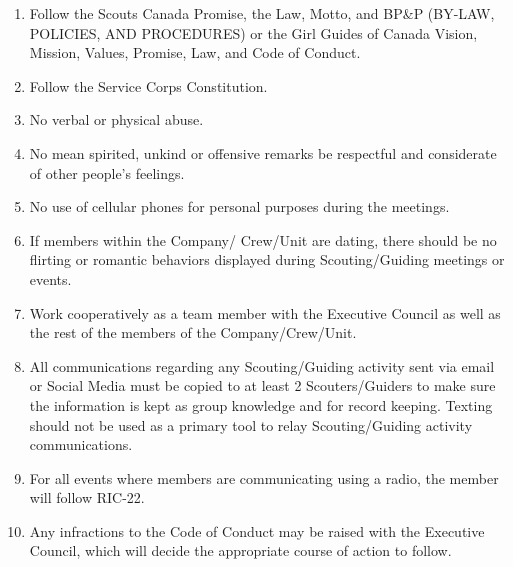 \documentclass{Service_Corps_Document}
\begin{document}
    \def \Title {Code of Conduct}
    \def \Company {Service Corps}
    \def \versionNumber {3.0}
    \stdFooter
    \begin{titlepage}
        \stdTitlePage
    \end{titlepage}
    \begin{enumerate}
        \item Follow the Scouts Canada Promise, the Law, Motto, and BP\&P (BY-LAW, POLICIES, AND PROCEDURES) or the Girl Guides of Canada Vision, Mission, Values, Promise, Law, and Code of Conduct.
        \item Follow the Service Corps Constitution.
        \item No verbal or physical abuse.
        \item No mean spirited, unkind or offensive remarks \textendash be respectful and considerate of other people's feelings.
        \item No use of cellular phones for personal purposes during the meetings.
        \item If members within the Company/ Crew/Unit are dating, there should be no flirting or romantic behaviors displayed during Scouting/Guiding meetings or events.
        \item Work cooperatively as a team member with the Executive Council as well as the rest of the members of the Company/Crew/Unit.
        \item All communications regarding any Scouting/Guiding activity sent via email or Social Media must be copied to at least 2 Scouters/Guiders to make sure the information is kept as group knowledge and for record keeping.
        Texting should not be used as a primary tool to relay Scouting/Guiding activity communications.
        \item For all events where members are communicating using a radio, the member will follow RIC-22.
        \item Any infractions to the Code of Conduct may be raised with the Executive Council, which will decide the appropriate course of action to follow.

    \end{enumerate}
\end{document}
